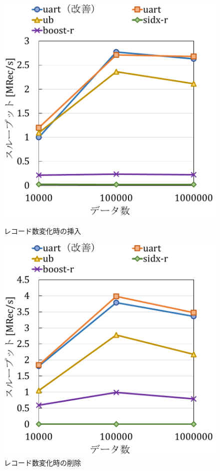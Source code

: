 \begin{figure}[tb]
  \begin{minipage}[c]{0.495\textwidth}
    \centering
    \includegraphics[scale=0.45]{./figures/graph-datasize-insert.pdf}
    \caption{レコード数変化時の挿入}
    \label{graph:rec-ins}
  \end{minipage}
  \begin{minipage}[c]{0.495\textwidth}
    \centering
    \includegraphics[scale=0.45]{./figures/graph-datasize-delete.pdf}
    \caption{レコード数変化時の削除}
    \label{graph:rec-del}
  \end{minipage}
\end{figure}

